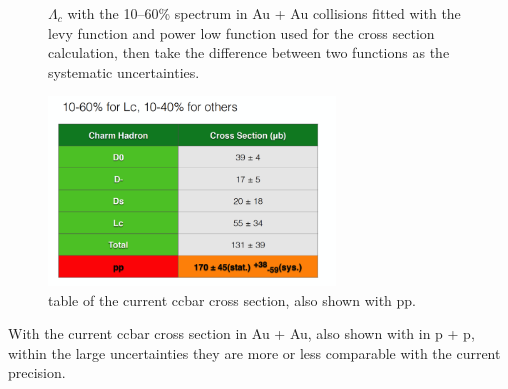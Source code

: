 \begin{figure}[htbp]
\begin{minipage}[htbp]{0.47\linewidth}
\caption{$\Lambda_{c}$ with the 10--60\% spectrum in Au + Au collisions fitted with the levy function and power low function used for the cross section calculation, then take the difference between two functions as the systematic uncertainties. \label{ccx_4}}
\end{minipage}
\end{figure}

\begin{figure}
\centering
\includegraphics[width=0.68\textwidth]{figure/Run14_D0HFT/ccx_5.png}
\caption{table of the current ccbar cross section, also shown with pp.}
\label{figure:ccx_5} 
\end{figure}

With the current ccbar cross section in Au + Au, also shown with in p + p, within the large uncertainties they are more or less comparable with the current precision.
